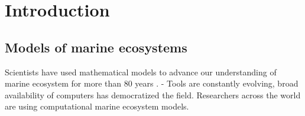 \documentclass[journal abbreviation, manuscript]{copernicus}
\begin{document}
\begin{abstract} [Just collecting ideas:]





\end{abstract}



\section{Introduction}


\subsection{Models of marine ecosystems}
Scientists have used mathematical models to advance our understanding of marine ecosystem for more than 80 years \citep{Gentleman2002a}. 
- Tools are constantly evolving, broad availability of computers has democratized the field. Researchers across the world are using computational marine ecosystem models.


\end{document}

